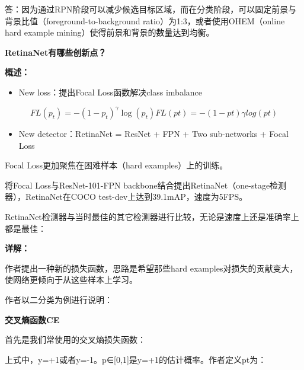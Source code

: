答：因为通过RPN阶段可以减少候选目标区域，而在分类阶段，可以固定前景与背景比值（foreground-to-background
ratio）为1:3，或者使用OHEM（online hard example
mining）使得前景和背景的数量达到均衡。

\textbf{RetinaNet有哪些创新点？}

\textbf{概述：}

\begin{itemize}
\item
  New loss：提出Focal Loss函数解决class imbalance
\end{itemize}

\[
FL(p_t) = -(1-p_t)^\gamma \log(p_t)FL(pt)=−(1−pt)γlog(pt)
\]

\begin{itemize}
\item
  New detector：RetinaNet = ResNet + FPN + Two sub-networks + Focal Loss
\end{itemize}

Focal Loss更加聚焦在困难样本（hard examples）上的训练。

\begin{figure}
\centering
\caption{}
\end{figure}

将Focal Loss与ResNet-101-FPN
backbone结合提出RetinaNet（one-stage检测器），RetinaNet在COCO
test-dev上达到39.1mAP，速度为5FPS。

RetinaNet检测器与当时最佳的其它检测器进行比较，无论是速度上还是准确率上都是最佳：

\begin{figure}
\centering
\caption{}
\end{figure}

\textbf{详解：}

作者提出一种新的损失函数，思路是希望那些hard
examples对损失的贡献变大，使网络更倾向于从这些样本上学习。

作者以二分类为例进行说明：

\textbf{交叉熵函数CE}

首先是我们常使用的交叉熵损失函数：

\begin{figure}
\centering
\caption{}
\end{figure}

上式中，y=+1或者y=-1。p∈{[}0,1{]}是y=+1的估计概率。作者定义pt为：

\begin{figure}
\centering
\caption{}
\end{figure}

